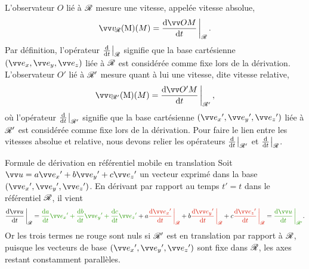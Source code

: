 \documentclass[12pt,fancy]{cours}
\begin{document}
 L'observateur $O$ lié à $\mathcal{R}$ mesure une vitesse, appelée vitesse absolue,
\begin{equation}
\vR(M) = \dR{\Vec{OM}}{t}{\Rcal}.
\end{equation}
Par définition, l'opérateur $\dR{}{t}{\Rcal}$ signifie que la base cartésienne $(\ex,\ey,\ez)$ liée à $\mathcal{R}$ est considérée comme fixe lors de la dérivation.
L'observateur $O'$ lié à $\mathcal{R}'$ mesure quant à lui une vitesse, dite vitesse relative,
\begin{equation}
\vRp(M) = \dR{\Vec{O'M}}{t}{\Rcal'},
\end{equation}
où l'opérateur $\dR{}{t}{\Rcal'}$ signifie que la base cartésienne $(\ex',\ey',\ez')$ liée à $\mathcal{R}'$ est considérée comme fixe lors de la dérivation. Pour faire le lien entre les vitesses absolue et relative, nous devons relier les opérateurs $\dR{}{t}{\Rcal'}$  et $\dR{}{t}{\Rcal}$.

\begin{rappel}{Formule de dérivation en référentiel mobile en translation}
Soit $\Vec{u} = a \ex' + b \ey' + c \ez'$ un vecteur exprimé dans la base $(\ex',\ey',\ez')$.
En dérivant par rapport au temps $t'=t$ dans le référentiel $\mathcal{R}$, il vient
\begin{align}\label{eq:deriv_formu}
\dR{\Vec {u}}{t}{\Rcal}  = \JVert{\dd{a}{t} \ex' + \dd{b}{t} \ey' + \dd{c}{t} \ez'} +  a \JRouge{\dR{\ex' }{t}{\Rcal}} + b  \JRouge{\dR{\ey'}{t}{\Rcal}}  + c  \JRouge{\dR{\ez' }{t}{\Rcal}}
= \JVert{\dR{\Vec {u}}{t}{\Rcal'}}.
\end{align}
Or les trois termes ne rouge sont nuls si $\mathcal{R}'$ est en translation par rapport à $\mathcal{R}$, puisque les vecteurs de base $(\ex',\ey',\ez')$ sont fixe dans $\mathcal{R}$, les axes restant constamment parallèles.
\end{rappel}
\end{document}

